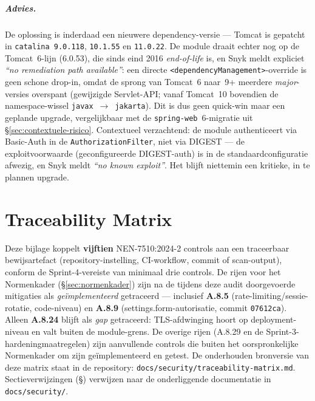 \documentclass[12pt, a4paper]{report}
\begin{document}
\paragraph{Advies.} De oplossing is inderdaad een nieuwere dependency-versie ---
Tomcat is gepatcht in \texttt{catalina 9.0.118}, \texttt{10.1.55} en
\texttt{11.0.22}. De module draait echter nog op de Tomcat~6-lijn (6.0.53), die
sinds eind 2016 \emph{end-of-life} is, en Snyk meldt expliciet \emph{``no remediation
path available''}: een directe \texttt{<dependencyManagement>}-override is geen
schone drop-in, omdat de sprong van Tomcat~6 naar~9+ meerdere \emph{major}-versies
overspant (gewijzigde Servlet-API; vanaf Tomcat~10 bovendien de namespace-wissel
\texttt{javax}~$\rightarrow$~\texttt{jakarta}). Dit is dus geen quick-win maar een
geplande upgrade, vergelijkbaar met de \texttt{spring-web}~6-migratie uit
\S\ref{sec:contextuele-risico}. Contextueel verzachtend: de module authenticeert via
Basic-Auth in de \texttt{AuthorizationFilter}, niet via DIGEST --- de exploitvoorwaarde
(geconfigureerde DIGEST-auth) is in de standaardconfiguratie afwezig, en Snyk meldt
\emph{``no known exploit''}. Het blijft niettemin een kritieke, in te plannen upgrade.

\chapter{Traceability Matrix}
\label{app:traceability}

Deze bijlage koppelt \textbf{vijftien} NEN-7510:2024-2 controls aan een
traceerbaar bewijsartefact (repository-instelling, CI-workflow, commit of
scan-output), conform de Sprint-4-vereiste van minimaal drie controls. De rijen
voor het Normenkader (\S\ref{sec:normenkader}) zijn na de tijdens deze audit
doorgevoerde mitigaties als \emph{geïmplementeerd} getraceerd --- inclusief
\textbf{A.8.5} (rate-limiting/sessie-rotatie, code-niveau) en \textbf{A.8.9}
(settings.form-autorisatie, commit \texttt{07612ca}). Alleen \textbf{A.8.24}
blijft als \emph{gap} getraceerd: TLS-afdwinging hoort op deployment-niveau en
valt buiten de module-grens. De overige rijen (A.8.29 en de
Sprint-3-hardeningmaatregelen) zijn aanvullende controls die buiten het
oorspronkelijke Normenkader om zijn geïmplementeerd en getest. De
onderhouden bronversie van deze matrix staat in de repository:
\texttt{docs/security/traceability-matrix.md}. Sectieverwijzingen
(\S) verwijzen naar de onderliggende documentatie in \texttt{docs/security/}.
\end{document}
